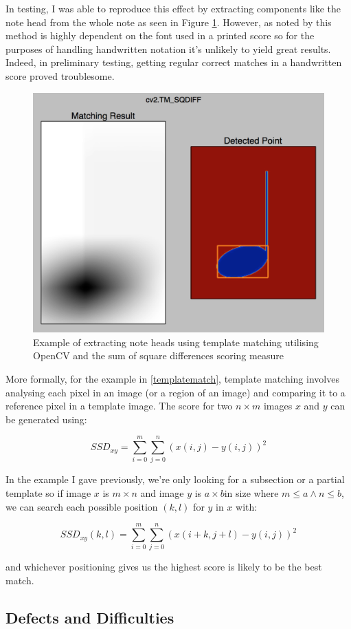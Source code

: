 In testing, I was able to reproduce this effect by extracting components like the note head from the whole note as seen in Figure \cref{fig:templatematch}. However, as noted by \citeauthor{rossant2002global} this method is highly dependent on the font used in a printed score so for the purposes of handling handwritten notation it's unlikely to yield great results. Indeed, in preliminary testing, getting regular correct matches in a handwritten score proved troublesome.

\begin{figure}[h!]
  \includegraphics[width=0.6\linewidth]{gfx/template.png}
  \centering
  \caption{Example of extracting note heads using template matching utilising OpenCV and the sum of square differences scoring measure}
  \label{fig:templatematch}
\end{figure}

More formally, for the example in \cref{templatematch}, template matching involves analysing each pixel in an image (or a region of an image) and comparing it to a reference pixel in a template image. The score for two $n \times m$ images $x$ and $y$ can be generated using:

$$SSD_{xy} = \sum_{i = 0}^m \sum_{j = 0}^n (x(i, j) - y(i, j))^2$$

In the example I gave previously, we're only looking for a subsection or a partial template so if image $x$ is $m \times n$ and image $y$ is $a \times b$in size where $m \le a \land n \le b$, we can search each possible position $(k, l)$ for $y$ in $x$ with:

$$SSD_{xy}(k, l) = \sum_{i = 0}^m \sum_{j = 0}^n (x(i + k, j + l) - y(i, j))^2$$

and whichever positioning gives us the highest score is likely to be the best match.

\subsection{Defects and Difficulties}

